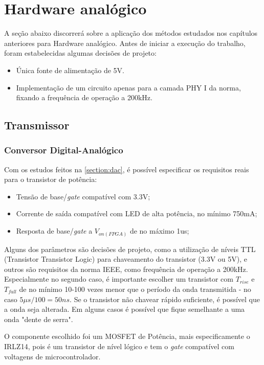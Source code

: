 	
	\section{Hardware analógico}
	A seção abaixo discorrerá sobre a aplicação dos métodos estudados nos capítulos anteriores para Hardware analógico.
	Antes de iniciar a execução do trabalho, foram estabelecidas algumas decisões de projeto:
	
	\begin{itemize}
		\item Única fonte de alimentação de 5V.
		\item Implementação de um circuito apenas para a camada PHY I da norma, fixando a frequência de operação a 200kHz.
	\end{itemize}

	\subsection{Transmissor}
	
	\subsubsection{Conversor Digital-Analógico}
	Com os estudos feitos na \autoref{section:dac}, é possível especificar os requisitos reais para o transistor de potência:

	\begin{itemize}
		\item Tensão de base/\textit{gate} compatível com 3.3V;
		\item Corrente de saída compatível com LED de alta potência, no mínimo 750mA;
		\item Resposta de base/\textit{gate} a $V_{on(FPGA)}$ de no máximo 1us;
	\end{itemize}
	
	Alguns dos parâmetros são decisões de projeto, como a utilização de níveis TTL (Transistor Transistor Logic) para chaveamento do transistor (3.3V ou 5V), e outros são requisitos da norma IEEE, como frequência de operação a 200kHz. Especialmente no segundo caso, é importante escolher um transistor com $T_{rise}$ e $T_{fall}$ de no mínimo 10-100 vezes menor que o período da onda transmitida - no caso $5\mu$$s/100 = 50ns$. Se o transistor não chavear rápido suficiente, é possível que a onda seja alterada. Em alguns casos é possível que fique semelhante a uma onda "dente de serra".
	
	O componente escolhido foi um MOSFET de Potência, mais especificamente o IRLZ14, pois é um transistor de nível lógico e tem o \textit{gate} compatível com voltagens de microcontrolador. 


